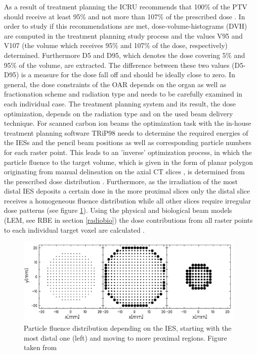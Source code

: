 As a result of treatment planning the ICRU recommends that 100\% of the PTV should receive at least 95\% and not more than 107\% of the 
prescribed dose \cite{ICRU93a}. In order to study if this recommendations are met, dose-volume-histograms (DVH) are computed in the 
treatment planning study process and the values V95 and V107 (the volume which receives 95\% and 107\% of the dose, respectively) determined. 
Furthermore D5 and D95, which denotes the dose covering 5\% and 95\% of the volume, are extracted. The difference between these two values 
(D5-D95) is a measure for the dose fall off and should be ideally close to zero. In general, the dose constraints of the OAR depends on the 
organ as well as fractionation scheme and radiation type and needs to be carefully examined in each individual case.\newline
\newline
The treatment planning system and its result, the dose optimization, depends on the radiation type and on the used beam delivery 
technique. For scanned carbon ion beams the optimization task with the in-house treatment planning software TRiP98 \cite{Krae00} 
\cite{Krae00b} needs to determine the required energies of the IESs and the pencil beam positions as well as corresponding particle numbers 
for each raster point. This leads to an 'inverse' optimization process, in which the particle fluence to the target volume, which is given in 
the form of planar polygon originating from manual delineation on the axial CT slices \cite{Ric13}, is determined from the prescribed dose 
distribution \cite{Kra00}. Furthermore, as the irradiation 
of the most distal IES deposits a certain dose in the more proximal slices only the distal slice 
receives a homogeneous fluence distribution while all other slices require irregular dose patterns (see figure \ref{inhomo}). Using the 
physical and biological beam models (LEM, see RBE in section \ref{radiobio}) the dose contributions from all raster points to each 
individual target voxel are calculated \cite{Ric12}. 

\begin{figure}[H]
\begin{center}
\includegraphics[scale=0.4]{./teile/introduction/inhomo.png}
\caption{Particle fluence distribution depending on the IES, starting with the most distal one (left) and moving to more proximal regions. 
Figure taken from \cite{Krae00}}
\label{inhomo}
\end{center}
\end{figure}

